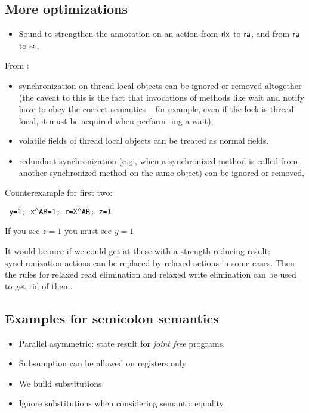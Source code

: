 \subsection{More optimizations}

\begin{itemize}
\item Sound to strengthen the annotation on an action from ${\mathsf{rlx}}$ to
  ${\mathsf{ra}}$, and from ${\mathsf{ra}}$ to ${\mathsf{sc}}$.
\end{itemize}

From \cite{Manson:2005:JMM:1047659.1040336}:
\begin{itemize}
\item synchronization on thread local objects can be ignored or removed
  altogether (the caveat to this is the fact that invocations of methods like
  wait and notify have to obey the correct semantics – for example, even if
  the lock is thread local, it must be acquired when perform- ing a wait),
  
\item volatile fields of thread local objects can be treated as normal
  fields.

\item redundant synchronization (e.g., when a synchronized method is called
  from another synchronized method on the same object) can be ignored or
  removed,
  
\end{itemize}

Counterexample for first two:
\begin{verbatim}
 y=1; x^AR=1; r=X^AR; z=1
\end{verbatim}
If you see $z=1$ you must see $y=1$

It would be nice if we could get at these with a strength reducing result:
synchronization actions can be replaced by relaxed actions in some cases.
Then the rules for relaxed read elimination and relaxed write elimination can
be used to get rid of them.

\subsection{Examples for semicolon semantics}

\begin{itemize}
\item Parallel asymmetric: state result for \emph{joint free} programs. 
\item Subsumption can be allowed on registers only
\item We build substitutions
\item Ignore substitutions when considering semantic equality.
\end{itemize}


